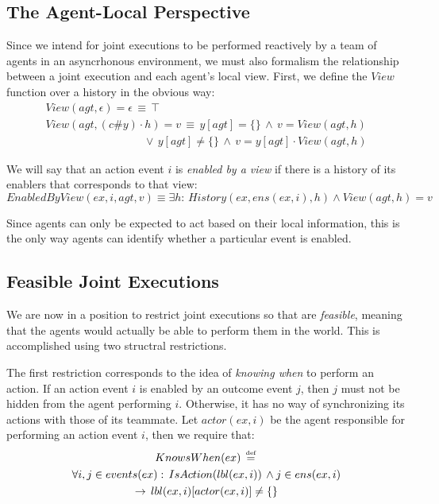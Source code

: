 \subsection{The Agent-Local Perspective}

Since we intend for joint executions to be performed reactively by
a team of agents in an asyncrhonous environment, we must also formalism
the relationship between a joint execution and each agent's local
view. First, we define the $View$ function over a history in the
obvious way:\begin{gather*}
View(agt,\epsilon)=\epsilon\,\equiv\,\top\\
View(agt,(c\#y)\cdot h)=v\,\equiv\, y[agt]=\{\}\,\wedge\, v=View(agt,h)\\
\,\,\,\,\,\,\,\,\,\,\,\,\,\,\,\,\,\,\,\,\,\,\,\,\,\,\,\,\,\,\,\,\,\,\,\,\,\,\,\,\,\,\,\,\,\,\,\,\,\,\,\,\,\vee\, y[agt]\neq\{\}\,\wedge\, v=y[agt]\cdot View(agt,h)\end{gather*}


We will say that an action event $i$ is \emph{enabled by a view}
if there is a history of its enablers that corresponds to that view:
\[
EnabledByView(ex,i,agt,v)\equiv\exists h:\, History(ex,ens(ex,i),h)\wedge View(agt,h)=v\]


Since agents can only be expected to act based on their local information,
this is the only way agents can identify whether a particular event
is enabled.


\subsection{Feasible Joint Executions}

We are now in a position to restrict joint executions so that are
\emph{feasible}, meaning that the agents would actually be able to
perform them in the world. This is accomplished using two structral
restrictions.

The first restriction corresponds to the idea of \emph{knowing when}
to perform an action. If an action event $i$ is enabled by an outcome
event $j$, then $j$ must not be hidden from the agent performing
$i$. Otherwise, it has no way of synchronizing its actions with those
of its teammate. Let $actor(ex,i)$ be the agent responsible for performing
an action event $i$, then we require that:\begin{multline*}
KnowsWhen(ex)\,\stackrel{\mbox{\tiny def}}{=}\,\\
\forall i,j\in events(ex):\, IsAction(lbl(ex,i))\,\wedge j\in ens(ex,i)\\
\rightarrow\, lbl(ex,i)[actor(ex,i)]\neq\{\}\end{multline*}


